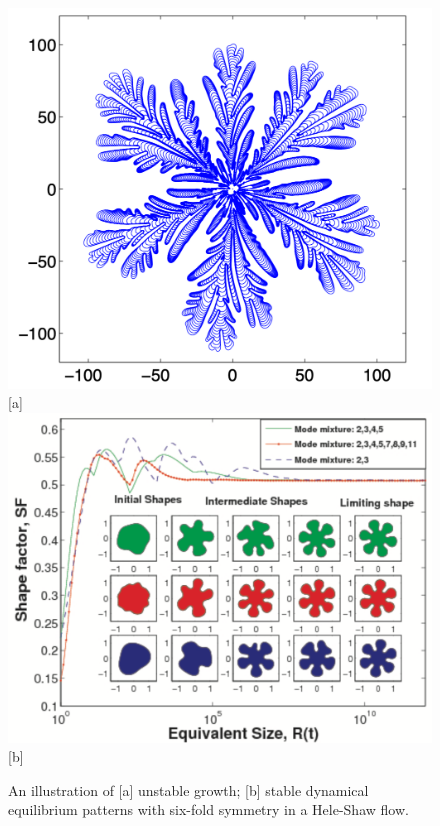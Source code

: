 \begin{figure}
  \includegraphics[scale=0.2]{Unstable}[a]
  \includegraphics[scale=0.2]{Stable2}[b]
  \caption{An illustration of [a] unstable growth; [b] stable  dynamical equilibrium patterns with six-fold symmetry in a Hele-Shaw flow.}
  \label{figA}
  \end{figure}

